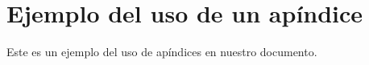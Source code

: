 \chapter{Ejemplo del uso de un apíndice}

Este es un ejemplo del uso de apíndices en nuestro documento. 
